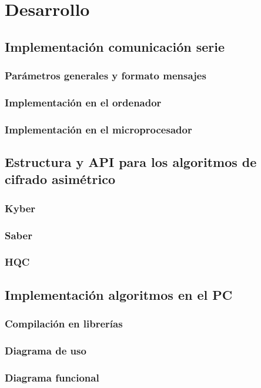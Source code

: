 \chapter{Desarrollo}
\section{Implementación comunicación serie}
\subsection{Parámetros generales y formato mensajes}
\subsection{Implementación en el ordenador}
\subsection{Implementación en el microprocesador}
\section{Estructura y API para los algoritmos de cifrado asimétrico}
\subsection{Kyber}
\subsection{Saber}

\subsection{HQC}
\section{Implementación algoritmos en el PC}
\subsection{Compilación en librerías}
\subsection{Diagrama de uso}
\subsection{Diagrama funcional}
